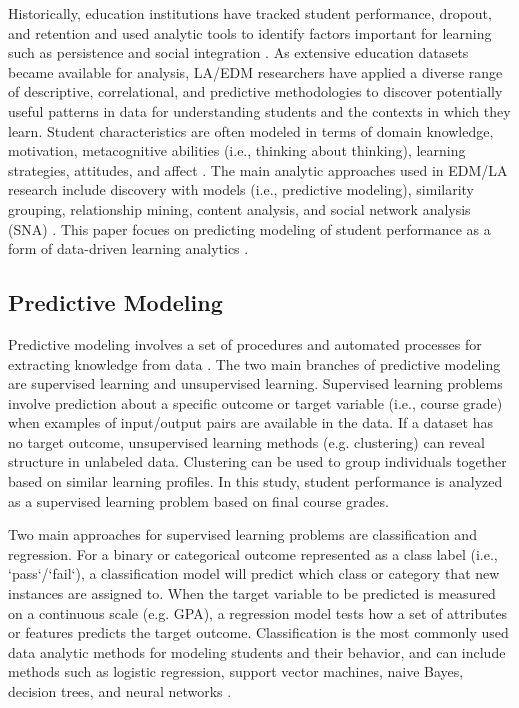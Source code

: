 \documentclass[sigconf]{acmart}
\begin{document}
Historically, education institutions have tracked student performance, 
dropout, and retention and used analytic tools to identify factors important 
for learning such as persistence and social integration \cite{ferguson12}. 
As extensive education datasets became available for analysis, LA/EDM 
researchers have applied a diverse range of descriptive, correlational, and 
predictive methodologies to discover potentially useful patterns in data for 
understanding students and the contexts in which they learn. Student 
characteristics are often modeled in terms of domain knowledge, motivation, 
metacognitive abilities (i.e., thinking about thinking), learning strategies, 
attitudes, and affect \cite{papamitsiou14}. The main analytic approaches used 
in EDM/LA research include discovery with models (i.e., predictive modeling), 
similarity grouping, relationship mining, content analysis, and social network 
analysis (SNA) \cite{baker09}. This paper focues on predicting modeling of
student performance as a form of data-driven learning analytics
\cite{verbert12}. 


\subsection{Predictive Modeling}

Predictive modeling involves a set of procedures and automated processes for 
extracting knowledge from data \cite{jamesetal13, kuhn13}. The two main 
branches of predictive modeling are supervised learning and unsupervised 
learning. Supervised learning problems involve prediction about a specific 
outcome or target variable (i.e., course grade) when examples of input/output 
pairs are available in the data. If a dataset has no target outcome, 
unsupervised learning methods (e.g. clustering) can reveal structure in 
unlabeled data. Clustering can be used to group individuals together based 
on similar learning profiles. In this study, student performance is analyzed
as a supervised learning problem based on final course grades. 


Two main approaches for supervised learning problems are classification and 
regression. For a binary or categorical outcome represented as a class label 
(i.e., `pass`/`fail`), a classification model will predict which class or 
category that new instances are assigned to. When the target variable to be 
predicted is measured on a continuous scale (e.g. GPA), a regression model 
tests how a set of attributes or features predicts the target outcome. 
Classification is the most commonly used data analytic methods for modeling 
students and their behavior, and can include methods such as logistic 
regression, support vector machines, naive Bayes, decision trees, and 
neural networks \cite{Lykourentzou09, pariyadath14, zhang05}. 
\end{document}
